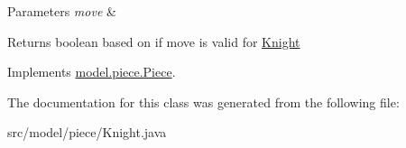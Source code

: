 \begin{DoxyParams}{Parameters}
{\em move} & \\
\hline
\end{DoxyParams}
\begin{DoxyReturn}{Returns}
boolean based on if move is valid for \hyperlink{classmodel_1_1piece_1_1_knight}{Knight} 
\end{DoxyReturn}


Implements \hyperlink{classmodel_1_1piece_1_1_piece_af7ce06755c9f20f3481796ca5b512849}{model.\-piece.\-Piece}.



The documentation for this class was generated from the following file\-:\begin{DoxyCompactItemize}
\item 
src/model/piece/Knight.\-java\end{DoxyCompactItemize}
